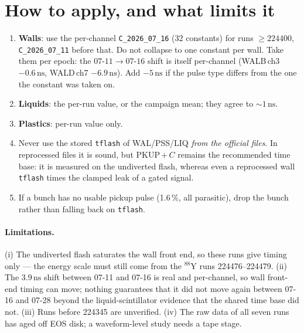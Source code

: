 \documentclass[11pt,a4paper]{article}
\newcommand{\ns}{\,\mathrm{ns}}
\begin{document}
\section{How to apply, and what limits it}

\begin{enumerate}
\item \textbf{Walls}: use the per-channel \texttt{C\_2026\_07\_16} (32
constants) for runs $\geq 224400$, \texttt{C\_2026\_07\_11} before that. Do not
collapse to one constant per wall. Take them per epoch: the
$07\text{-}11\rightarrow07\text{-}16$ shift is itself per-channel (WALB\,ch3
$-0.6\ns$, WALD\,ch7 $-6.9\ns$). Add $-5\ns$ if the pulse type differs from the
one the constant was taken on.
\item \textbf{Liquids}: the per-run value, or the campaign mean; they agree to
${\sim}1\ns$.
\item \textbf{Plastics}: per-run value only.
\item Never use the stored \texttt{tflash} of WAL/PSS/LIQ \emph{from the
official files}. In reprocessed files it is sound, but PKUP\,$+\,C$ remains the
recommended time base: it is measured on the undiverted flash, whereas even a
reprocessed wall \texttt{tflash} times the clamped leak of a gated signal.
\item If a bunch has no usable pickup pulse (1.6\,\%, all parasitic), drop the
bunch rather than falling back on \texttt{tflash}.
\end{enumerate}

\paragraph{Limitations.} (i) The undiverted flash saturates the wall front end,
so these runs give timing only --- the energy scale must still come from the
$^{88}$Y runs 224476--224479. (ii) The $3.9\ns$ shift between 07-11 and 07-16 is
real and per-channel, so wall front-end timing can move; nothing guarantees that
it did not move again between 07-16 and 07-28 beyond the liquid-scintillator
evidence that the shared time base did not. (iii) Runs before 224345 are
unverified. (iv) The raw data of all seven runs has aged off EOS disk; a
waveform-level study needs a tape stage.
\end{document}
